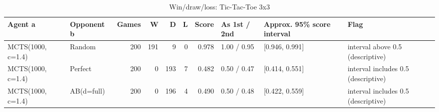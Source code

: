 \begin{table}[!t]
\centering
\caption{Win/draw/loss: Tic-Tac-Toe 3x3}
\label{tab:wdl_ttt3}
\small
\begin{tabular}{llrrrrrlll}
\toprule
Agent a & Opponent b & Games & W & D & L & Score & As 1st / 2nd & Approx. 95\% score interval & Flag \\
\midrule
MCTS(1000, c=1.4) & Random & 200 & 191 & 9 & 0 & 0.978 & 1.00 / 0.95 & [0.946, 0.991] & interval above 0.5 (descriptive) \\
MCTS(1000, c=1.4) & Perfect & 200 & 0 & 193 & 7 & 0.482 & 0.50 / 0.47 & [0.414, 0.551] & interval includes 0.5 (descriptive) \\
MCTS(1000, c=1.4) & AB(d=full) & 200 & 0 & 196 & 4 & 0.490 & 0.50 / 0.48 & [0.422, 0.559] & interval includes 0.5 (descriptive) \\
\bottomrule
\end{tabular}
\end{table}
